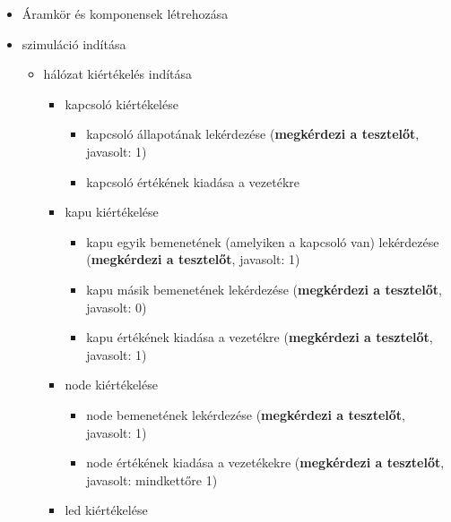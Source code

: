 {\vspace{-15pt}
\begin{itemize}
\setlength{\itemsep}{0cm}%
\setlength{\parskip}{0cm}%
\setlength{\itemindent}{-15pt}%
\item Áramkör és komponensek létrehozása
\item szimuláció indítása
\begin{itemize}
\setlength{\itemsep}{0cm}%
\setlength{\parskip}{0cm}%
\setlength{\itemindent}{-35pt}%
\item hálózat kiértékelés indítása
\begin{itemize}
\setlength{\itemsep}{0cm}%
\setlength{\parskip}{0cm}%
\setlength{\itemindent}{-50pt}%
	\item kapcsoló kiértékelése
	\begin{itemize}
	\setlength{\itemsep}{0cm}%
	\setlength{\parskip}{0cm}%
	\setlength{\itemindent}{-65pt}%
		\item kapcsoló állapotának lekérdezése (\textbf{megkérdezi a tesztelőt}, javasolt: 1)
		\item kapcsoló értékének kiadása a vezetékre
	\end{itemize}
	\item kapu kiértékelése
	\begin{itemize}
	\setlength{\itemsep}{0cm}%
	\setlength{\parskip}{0cm}%
	\setlength{\itemindent}{-65pt}%
		\item kapu egyik bemenetének (amelyiken a kapcsoló van) lekérdezése (\textbf{megkérdezi a tesztelőt}, javasolt: 1)
		\item kapu másik bemenetének lekérdezése (\textbf{megkérdezi a tesztelőt}, javasolt: 0)
		\item kapu értékének kiadása a vezetékre (\textbf{megkérdezi a tesztelőt}, javasolt: 1)
	\end{itemize}
	\item node kiértékelése
	\begin{itemize}
	\setlength{\itemsep}{0cm}%
	\setlength{\parskip}{0cm}%
	\setlength{\itemindent}{-65pt}%
		\item node bemenetének lekérdezése (\textbf{megkérdezi a tesztelőt}, javasolt: 1)
		\item node értékének kiadása a vezetékekre (\textbf{megkérdezi a tesztelőt}, javasolt: mindkettőre 1)
	\end{itemize}
	\item led kiértékelése
	\begin{itemize}
	\setlength{\itemsep}{0cm}%
	\setlength{\parskip}{0cm}%
	\setlength{\itemindent}{-65pt}%

\end{itemize}
\end{itemize}
\end{itemize}
\end{itemize}}
